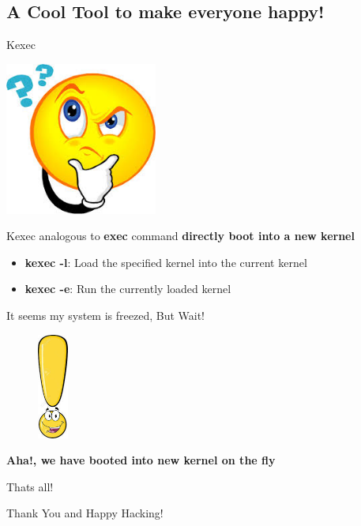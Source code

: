 \documentclass{beamer}
\begin{document}
\subsection{A Cool Tool to make everyone happy!}
\begin{frame}
\begin{center}
\huge Kexec
\end{center}

\end{frame}


    

    
    \begin{center}
    \includegraphics[width=5cm]{smily.jpeg}
    \end{center}
   



\begin{frame}{ Kexec } {analogous to \textbf{exec} command}    
	\textbf{directly boot into a new kernel }
	\pause
	\begin{itemize}
		\item {
			\textbf{kexec -l}: Load the specified kernel into the current kernel
			\pause
			}

		\item {   
			\textbf{kexec -e}: Run the currently loaded kernel

			}

	\end{itemize}

\end{frame}

\begin{frame}
\begin{center}
	\huge{\alert{It seems my system is freezed, But Wait!} }
\end{center}
\end{frame}	

\begin{frame}
	\begin{figure}[htp]
    \centering
    \includegraphics[width=1cm]{happ.jpeg}
    \end{figure}
	\textbf{Aha!, we have booted into new kernel on the fly}

\end{frame}

\begin{frame}{Thats all!}
\begin{center}
\Huge Thank You and Happy Hacking!
\end{center}
	
\end{frame}
\end{document}
